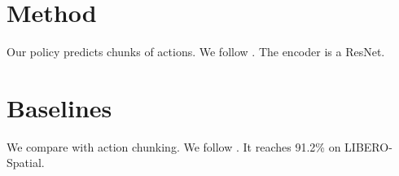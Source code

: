\documentclass{article}
\begin{document}
\section{Method}
Our policy predicts chunks of actions. We follow \citet{act}. The encoder is a ResNet.

\section{Baselines}
We compare with action chunking. We follow \citet{act}. It reaches 91.2\% on LIBERO-Spatial.



\end{document}
